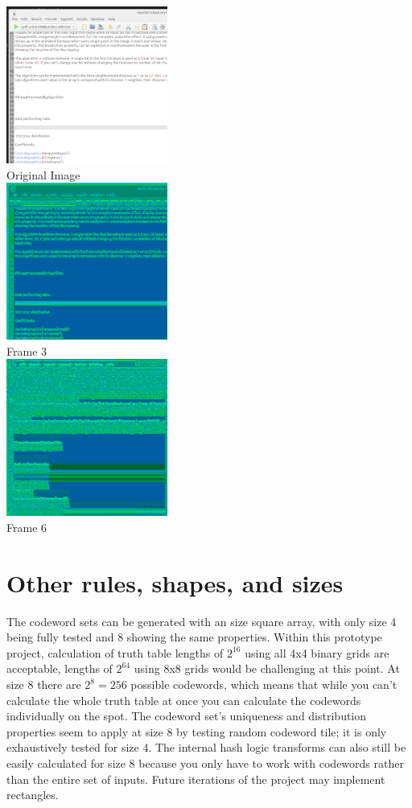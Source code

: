 \documentclass[11pt]{article}
\begin{document}
\begin{center}
\includegraphics{testScreenshot}\\
Original Image\\
\includegraphics{processedDepth3}\\
Frame 3\\
\includegraphics{processedDepth6}\\
Frame 6\\
\end{center}

\section{Other rules, shapes, and sizes}

The codeword sets can be generated with an size square array, with only size 4 being fully tested and 8 showing the same properties. Within this prototype project, calculation of truth table lengths of $2^{16}$ using all 4x4 binary grids are acceptable, lengths of $2^{64}$ using 8x8 grids would be challenging at this point. At size 8 there are $2^8=256$ possible codewords, which means that while you can't calculate the whole truth table at once you can calculate the codewords individually on the spot. The codeword set's uniqueness and distribution properties seem to apply at size 8 by testing random codeword tile; it is only exhaustively tested for size 4. The internal hash logic transforms can also still be easily calculated for size 8 because you only have to work with codewords rather than the entire set of inputs. Future iterations of the project may implement rectangles.\\
\end{document}
